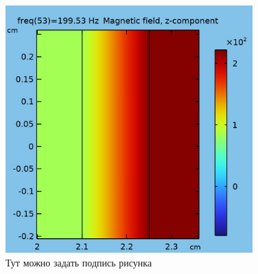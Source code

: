 \documentclass[a4paper, 12pt]{article}
\begin{document}
\begin{figure}[h!] %
    \begin{center}
    		\includegraphics[width=0.85\textwidth]{in_img.png} %
    \caption{Тут можно задать подпись рисунка}\label{fig_1}
    \end{center}
\end{figure}
\end{document}
